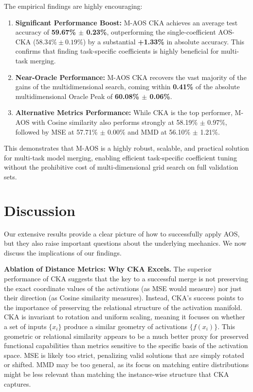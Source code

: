 \documentclass{article}
\theoremstyle{plain}
\theoremstyle{definition}
\theoremstyle{remark}
\begin{document}
The empirical findings are highly encouraging:
\begin{enumerate}
    \item \textbf{Significant Performance Boost:} M-AOS CKA achieves an average test accuracy of \textbf{59.67\% $\pm$ 0.23\%}, outperforming the single-coefficient AOS-CKA ($58.34\% \pm 0.19\%$) by a substantial \textbf{+1.33\%} in absolute accuracy. This confirms that finding task-specific coefficients is highly beneficial for multi-task merging.
    \item \textbf{Near-Oracle Performance:} M-AOS CKA recovers the vast majority of the gains of the multidimensional search, coming within \textbf{0.41\%} of the absolute multidimensional Oracle Peak of \textbf{60.08\% $\pm$ 0.06\%}.
    \item \textbf{Alternative Metrics Performance:} While CKA is the top performer, M-AOS with Cosine similarity also performs strongly at 58.19\% $\pm$ 0.97\%, followed by MSE at 57.71\% $\pm$ 0.00\% and MMD at 56.10\% $\pm$ 1.21\%.
\end{enumerate}
This demonstrates that M-AOS is a highly robust, scalable, and practical solution for multi-task model merging, enabling efficient task-specific coefficient tuning without the prohibitive cost of multi-dimensional grid search on full validation sets.

\section{Discussion}

Our extensive results provide a clear picture of how to successfully apply AOS, but they also raise important questions about the underlying mechanics. We now discuss the implications of our findings.

\textbf{Ablation of Distance Metrics: Why CKA Excels.} The superior performance of CKA suggests that the key to a successful merge is not preserving the exact coordinate values of the activations (as MSE would measure) nor just their direction (as Cosine similarity measures). Instead, CKA's success points to the importance of preserving the relational structure of the activation manifold. CKA is invariant to rotation and uniform scaling, meaning it focuses on whether a set of inputs $\{x_i\}$ produce a similar geometry of activations $\{f(x_i)\}$. This geometric or relational similarity appears to be a much better proxy for preserved functional capabilities than metrics sensitive to the specific basis of the activation space. MSE is likely too strict, penalizing valid solutions that are simply rotated or shifted. MMD may be too general, as its focus on matching entire distributions might be less relevant than matching the instance-wise structure that CKA captures.
\end{document}
